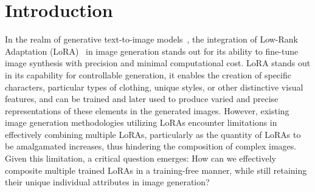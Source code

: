 \section{Introduction}
\vspace{-0.3em}
In the realm of generative text-to-image models~\citep{dalle,imagen, sdxl,sd3,sd1.5, clip}, the integration of Low-Rank Adaptation (LoRA)~\citep{lora} in image generation stands out for its ability to fine-tune image synthesis with precision and minimal computational cost. 
LoRA stands out in its capability for controllable generation, it enables the creation of specific characters, particular types of clothing, unique styles, or other distinctive visual features, and can be trained and later used to produce varied and precise representations of these elements in the generated images.
However, existing image generation methodologies utilizing LoRAs encounter limitations in effectively combining multiple LoRAs, particularly as the quantity of LoRAs to be amalgamated increases, thus hindering the composition of complex images.
Given this limitation, a critical question emerges: How can we effectively composite multiple trained LoRAs in a training-free manner, while still retaining their unique individual attributes in image generation?

